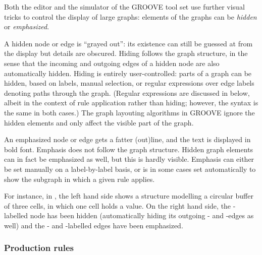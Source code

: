 Both the editor and the simulator of the GROOVE tool set use further visual
tricks to control the display of large graphs: elements of the graphs can be
\emph{hidden} or \emph{emphasized}. 

A hidden node or edge is ``grayed out'': its existence can still be guessed at
from the display but details are obscured. Hiding follows the graph structure,
in the sense that the incoming and outgoing edges of a hidden node are also
automatically hidden. Hiding is entirely user-controlled: parts of a graph can
be hidden, based on labels, manual selection, or regular expressions over edge
labels denoting paths through the graph. (Regular expressions are discussed in
 below, albeit in the context of rule application rather than
hiding; however, the syntax is the same in both cases.) The graph layouting
algorithms in GROOVE ignore the hidden elements and only affect the visible
part of the graph.

An emphasized node or edge gets a fatter (out)line, and the text is displayed
in bold font. Emphasis does not follow the graph structure. Hidden graph
elements can in fact be emphasized as well, but this is hardly visible.
Emphasis can either be set manually on a label-by-label basis, or is in some
cases set automatically to show the subgraph in which a given rule applies.

For instance, in , the left hand side shows a structure
modelling a circular buffer of three cells, in which one cell holds a value. On
the right hand side, the \Buffer-labelled node has been hidden (automatically
hiding its outgoing \First- and \Last-edges as well) and the \Val- and
\Next-labelled edges have been emphasized.


\subsubsection{Production rules}

